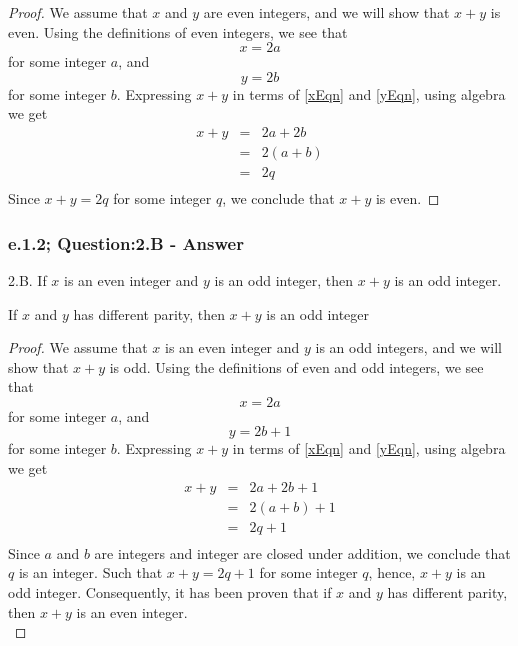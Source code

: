 \begin{proof}
We assume that $x$ and $y$ are even integers, and we will show that $x+y$ is even. Using the definitions of even integers, we see that
\begin{equation}
\label{xEqn}
x = 2a
\end{equation}
for some integer $a$, and
\begin{equation}
\label{yEqn}
y = 2b
\end{equation}
for some integer $b$. Expressing $x+y$ in terms of \ref{xEqn} and \ref{yEqn}, using algebra we get
\begin{eqnarray*}
x + y & = & 2a + 2b \nonumber \\
& = & 2(a+b) \nonumber \\
& = & 2q \nonumber \\
\end{eqnarray*}
Since $x+y = 2q$ for some integer $q$, we conclude that $x+y$ is even.
\end{proof}



\subsubsection*{e.1.2; Question:2.B - Answer}
2.B. If $x$ is an even integer and $y$ is an odd integer, then $x + y$ is an odd integer. \\

\begin{tcolorbox}
\begin{theorem}
If $x$ and $y$ has different parity, then $x + y$ is an odd integer
\end{theorem}
\end{tcolorbox}

\begin{proof}
We assume that $x$ is an even integer and $y$ is an odd integers, and we will show that $x+y$ is odd. Using the definitions of even and odd integers, we see that
\begin{equation}
\label{xEqn}
x = 2a
\end{equation}
for some integer $a$, and
\begin{equation}
\label{yEqn}
y = 2b + 1
\end{equation}
for some integer $b$. Expressing $x+y$ in terms of \ref{xEqn} and \ref{yEqn}, using algebra we get
\begin{eqnarray*}
x + y & = & 2a + 2b + 1  \nonumber \\
& = & 2(a+b) + 1 \nonumber \\
& = & 2q + 1 \nonumber \\
\end{eqnarray*}
Since $a$ and $b$ are integers and integer are closed under addition, we conclude that $q$ is an integer. Such that $x + y = 2q + 1$ for some integer $q$, hence, $x + y$ is an odd integer. Consequently, it has been proven that if $x$ and $y$ has different parity, then $x + y$ is an even integer. \\
\end{proof}



